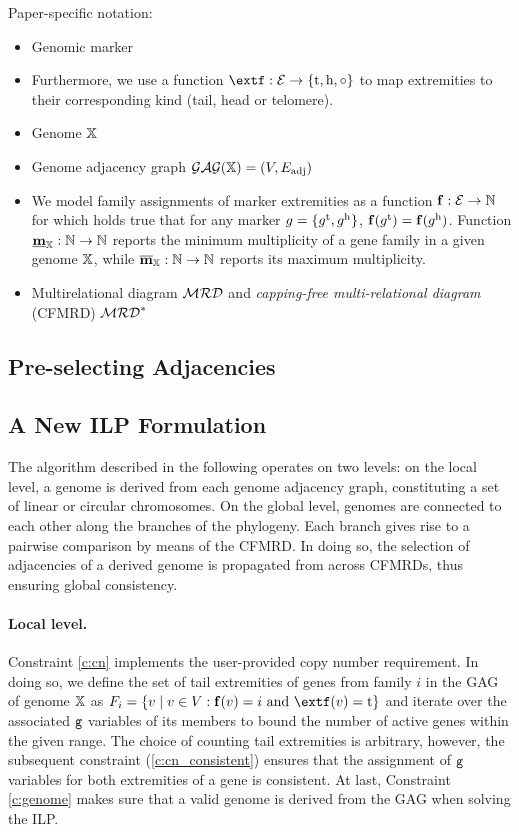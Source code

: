 \documentclass[runningheads]{llncs}
\begin{document}
Paper-specific notation:

\begin{itemize}
    \item Genomic marker 
    \item Furthermore, we use a function $\extf : \extremities \to \{\et, \eh, \circ\}$ to map extremities to their corresponding kind (tail, head or telomere). 
    \item Genome $\mathbb{X}$
    \item Genome adjacency graph $\mathcal{GAG}(\mathbb{X}) = (V, {E}_\text{adj})$ 
    \item 
We model family assignments of marker extremities as a function $\mathbf{f}: \mathcal{E} \to \mathbb N$ for which holds true that for any marker $g = \{g^{\textnormal{t}}, g^{\textnormal{h}}\}$, $\mathbf{f}(g^{\textnormal{t}}) = \mathbf{f}(g^{\textnormal{h}})$.  
Function 
$\underline{\mathbf{m}}_{\mathbb{X}} : \mathbb N \to \mathbb N$ reports the minimum multiplicity of a gene family in a given genome $\mathbb{X}$, while $\overline{\mathbf{m}}_{\mathbb{X}}: \mathbb N \to \mathbb N$ reports its maximum multiplicity. 
    \item Multirelational diagram $\mathcal{MRD}$ and \emph{capping-free multi-relational diagram} (CFMRD) $\mathcal{MRD}^*$
\end{itemize}
\subsection{Pre-selecting Adjacencies}
\subsection{A New ILP Formulation}
The algorithm described in the following operates on two levels: 
on the local level, a genome is derived from each genome adjacency graph, constituting a set of linear or circular chromosomes. 
On the global level, genomes are connected to each other along the branches of the phylogeny. Each branch gives rise to a pairwise comparison by means of the CFMRD. 
In doing so, the selection of adjacencies of a derived genome is propagated from across CFMRDs, thus ensuring global consistency. 

\paragraph{Local level.} 
Constraint \ref{c:cn} implements the user-provided copy number requirement. 
In doing so, we define the set of tail extremities of genes from family $i$ in the GAG of genome $\mathbb{X}$ as $F_i = \{ v \mid v \in V: \family(v) = i \text{ and } \extf(v) = \et\}$ and iterate over the associated ${\texttt{g}}$ variables of its members to bound the number of active genes within the given range. The choice of counting tail extremities is arbitrary, however, the subsequent constraint (\ref{c:cn_consistent}) ensures that the assignment of ${\texttt{g}}$ variables for both extremities of a gene is consistent. At last, Constraint \ref{c:genome} makes sure that a valid genome is derived from the GAG when solving the ILP. 
\end{document}
